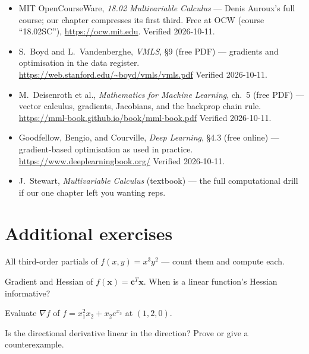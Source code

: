 \begin{itemize}
\item MIT OpenCourseWare, \emph{18.02 Multivariable Calculus}
--- Denis Auroux's full course; our chapter compresses its first
third. Free at OCW (course ``18.02SC''), \url{https://ocw.mit.edu}.
Verified 2026-10-11.
\item S.~Boyd and L.~Vandenberghe, \emph{VMLS}, \S9 (free PDF) ---
gradients and optimisation in the data register.\newline
\url{https://web.stanford.edu/~boyd/vmls/vmls.pdf}
Verified 2026-10-11.
\item M.~Deisenroth et al., \emph{Mathematics for Machine Learning},
ch.~5 (free PDF) --- vector calculus, gradients, Jacobians, and the
backprop chain rule.\newline
\url{https://mml-book.github.io/book/mml-book.pdf}
Verified 2026-10-11.
\item Goodfellow, Bengio, and Courville, \emph{Deep Learning}, \S4.3
(free online) --- gradient-based optimisation as used in practice.
\newline
\url{https://www.deeplearningbook.org/}
Verified 2026-10-11.
\item J.~Stewart, \emph{Multivariable Calculus} (textbook) --- the
full computational drill if our one chapter left you wanting reps.
\end{itemize}

\section*{Additional exercises}

\begin{exercise}[easy]
All third-order partials of $f(x,y)=x^{3}y^{2}$ --- count them and compute
each.
\end{exercise}

\begin{exercise}[easy]
Gradient and Hessian of $f(\mathbf x)=\mathbf c^{T}\mathbf x$. When is a
linear function's Hessian informative?
\end{exercise}

\begin{exercise}[easy]
Evaluate $\nabla f$ of $f=x_1^{2}x_2+x_2e^{x_3}$ at $(1,2,0)$.
\end{exercise}

\begin{exercise}[easy]
Is the directional derivative linear in the direction? Prove or give a
counterexample.
\end{exercise}


